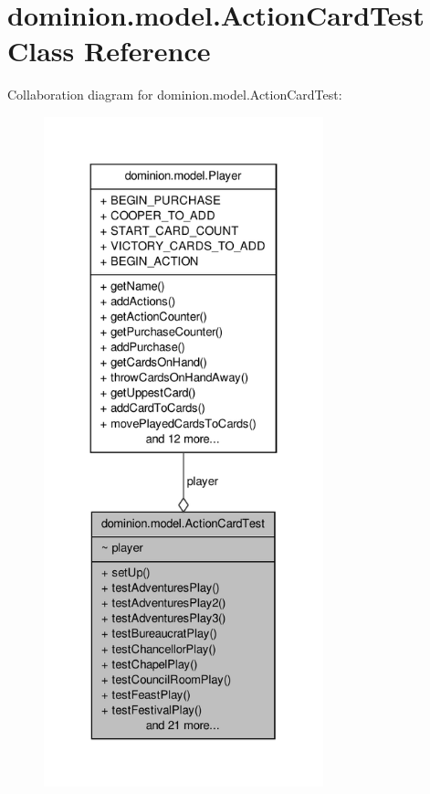 \hypertarget{classdominion_1_1model_1_1ActionCardTest}{\section{dominion.\-model.\-Action\-Card\-Test \-Class \-Reference}
\label{classdominion_1_1model_1_1ActionCardTest}
}


\-Collaboration diagram for dominion.\-model.\-Action\-Card\-Test\-:
\nopagebreak
\begin{figure}[H]
\begin{center}
\leavevmode
\includegraphics[height=550pt]{classdominion_1_1model_1_1ActionCardTest__coll__graph}
\end{center}
\end{figure}
